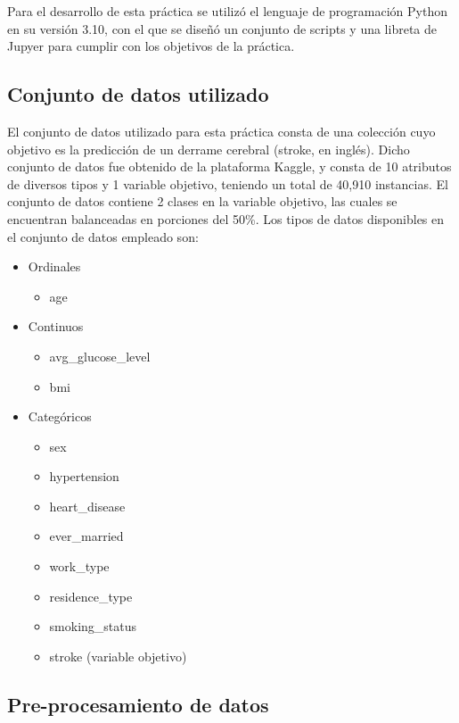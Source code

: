 Para el desarrollo de esta práctica se utilizó el lenguaje de programación Python en su versión 3.10, con el que se diseñó un conjunto de scripts y una libreta de Jupyer para cumplir con los objetivos de la práctica.

\subsection{Conjunto de datos utilizado}
El conjunto de datos utilizado para esta práctica consta de una colección cuyo objetivo es la predicción de un derrame cerebral (stroke, en inglés). Dicho conjunto de datos fue obtenido de la plataforma Kaggle, y consta de 10 atributos de diversos tipos y 1 variable objetivo, teniendo un total de 40,910 instancias. El conjunto de datos contiene 2 clases en la variable objetivo, las cuales se encuentran balanceadas en porciones del 50\%. Los tipos de datos disponibles en el conjunto de datos empleado son:

\begin{itemize}
	\item Ordinales
	\begin{itemize}
		\item age	
	\end{itemize}
	
	\item Continuos
	\begin{itemize}
		\item avg\_glucose\_level
		\item bmi
	\end{itemize}
	
	\item Categóricos
	\begin{itemize}
		\item sex
		\item hypertension
		\item heart\_disease
		\item ever\_married
		\item work\_type
		\item residence\_type
		\item smoking\_status
		\item stroke (variable objetivo)
	\end{itemize}
\end{itemize}

\subsection{Pre-procesamiento de datos}
